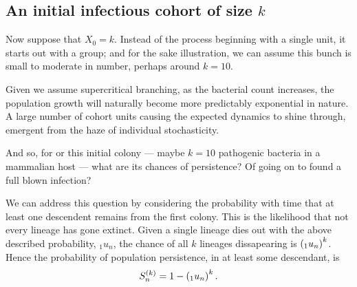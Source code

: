 \begin{center}

\end{center}



\subsection*{An initial infectious cohort of size $k$}
Now suppose that $X_0 = k$. Instead of the process beginning with a single unit, it starts out with a group; and for the sake illustration, we can assume this bunch is small to moderate in number, perhaps around $k = 10$.\par Given we assume supercritical branching, as the bacterial count increases, the population growth will naturally become more predictably exponential in nature. A large number of cohort units causing the expected dynamics to shine through, emergent from the haze of individual stochasticity.\par


And so, for or this initial colony --- maybe $k = 10$ pathogenic bacteria in a mammalian host --- what are its chances of persistence? Of going on to found a full blown infection?  \par
We can address this question by considering the probability with time that at least one descendent remains from the first colony. This is the likelihood that not every lineage has gone extinct. Given a single lineage dies out with the above described probability, ${}_1u_n$, the chance of all $k$ lineages dissapearing is $\left({}_1u_n\right)^k$. Hence the probability of population persistence, in at least some descendant, is 
$$S^{(k)}_n = 1 - \left({}_1u_n\right)^k.$$


